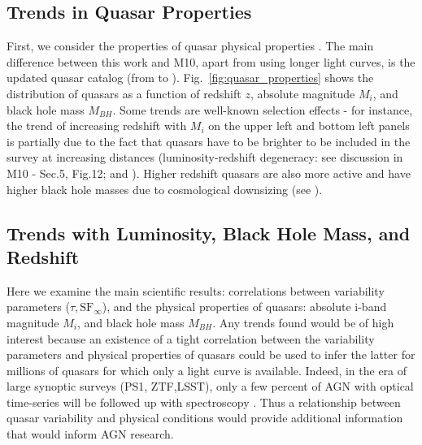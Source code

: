 \documentclass[twocolumn]{aastex62}
\begin{document}
\subsection{Trends in Quasar Properties}

\begin{figure*}
\caption{Distribution of quasars as a function of  redshift, observed i-band magnitude, absolute i-band magnitude (K-corrected to z=2), and virial black hole mass. All quantities from \citep{shen2011}. }
\label{fig:quasar_properties}
\end{figure*} 

First, we consider the properties of quasar physical properties \citep{shen2011}. The main difference between this work and M10, apart from using longer light curves, is the updated quasar catalog (from \citealt{shen2008} to \citealt{shen2011}).  Fig.~\ref{fig:quasar_properties} shows the distribution of quasars as a function of redshift $z$, absolute magnitude $M_{i}$, and black hole mass $M_{BH}$. Some trends are well-known selection effects -  for instance, the trend of increasing redshift with $M_{i}$ on the upper left and bottom left panels is partially due to the fact that quasars have to be brighter to be included in the survey at increasing distances (luminosity-redshift degeneracy: see discussion in M10 - Sec.5, Fig.12; and \citealt{dong2018}). Higher redshift quasars are also more active  and have higher black hole masses due to cosmological downsizing (see \citealt{babic2007,labita2009, mclure2004}).



\subsection{Trends with Luminosity, Black Hole Mass, and Redshift}

Here we examine the main scientific results: correlations between variability parameters  ($\tau, \mathrm{SF}_{\infty}$), and the physical properties of quasars: absolute i-band magnitude $M_{i}$, and black hole mass $M_{BH}$. Any trends found would be of high interest because an existence of a  tight correlation between the variability parameters and physical properties of quasars could be used to infer the latter for millions of quasars for which only a light curve is available. Indeed, in the era of large synoptic surveys (PS1, ZTF,LSST), only a few percent of AGN with optical time-series will be followed up with spectroscopy \citep{ivezic2019}.  Thus a relationship between quasar variability and physical conditions would provide additional information that would inform  AGN research. 
\end{document}
